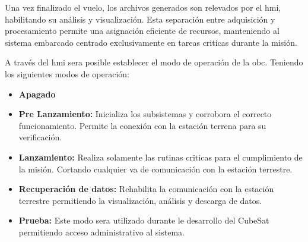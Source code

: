 \begin{itemize}
        Una vez finalizado el vuelo, los archivos generados son relevados por el \acrshort{hmi}, habilitando
        su análisis y visualización. Esta separación entre adquisición y procesamiento permite una asignación
        eficiente de recursos, manteniendo al sistema embarcado centrado
        exclusivamente en tareas criticas durante la misión.

        A través del \acrshort{hmi} sera posible establecer el modo de operación de la \acrshort{obc}. Teniendo los siguientes modos de operación:
        \begin{itemize}
           \item \textbf{Apagado}
           \item \textbf{Pre Lanzamiento:} Inicializa los subsistemas y corrobora el correcto funcionamiento.
            Permite la conexión con la estación terrena para su verificación.
           \item \textbf{Lanzamiento:} Realiza solamente las rutinas criticas para el cumplimiento de la
          misión. Cortando cualquier va de comunicación con la estación terrestre.
           \item \textbf{Recuperación de datos:} Rehabilita la comunicación con la estación terrestre
          permitiendo la visualización, análisis y descarga de datos.
           \item \textbf{Prueba:} Este modo sera utilizado durante le desarrollo del CubeSat permitiendo
          acceso administrativo al sistema.
        \end{itemize}


\end{itemize}
